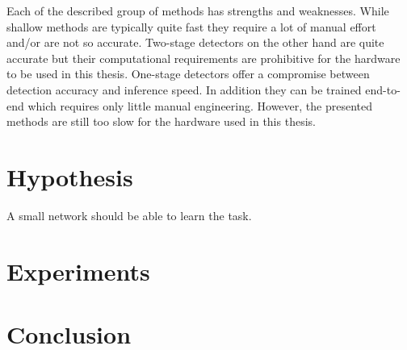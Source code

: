 Each of the described group of methods has strengths and weaknesses. While shallow methods are typically quite fast they require a lot of manual effort and/or are not so accurate. Two-stage detectors on the other hand are quite accurate but their computational requirements are prohibitive for the hardware to be used in this thesis. One-stage detectors offer a compromise between detection accuracy and inference speed. In addition they can be trained end-to-end which requires only little manual engineering. However, the presented methods are still too slow for the hardware used in this thesis.








\section{Hypothesis}

A small network should be able to learn the task.
\newpage
\section{Experiments}


\section{Conclusion}